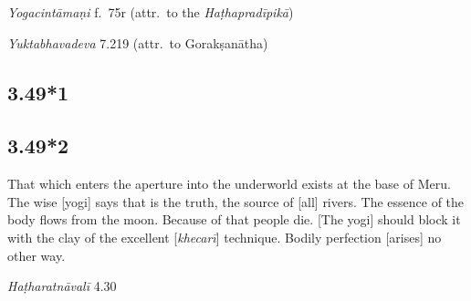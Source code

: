 \begin{ekdosis}
\begin{testimonia}[hp03_049]
\emph{Yogacintāmaṇi} f.~75r (attr.~to the \emph{Haṭhapradīpikā})
\begin{versinnote}
\end{versinnote}

\emph{Yuktabhavadeva} 7.219 (attr.~to Gorakṣanātha)
\begin{versinnote}
\end{versinnote}
\end{testimonia}


\subsection*{3.49*1}


\subsection*{3.49*2}
\begin{translation}[hp03_049_2]
That which enters the aperture into the underworld exists at the base of Meru. The wise [yogi] says that is the truth, the source of [all] rivers. The essence of the body flows from the moon. Because of that people die. [The yogi] should block it with the clay of the excellent [\emph{khecarī}] technique. Bodily perfection [arises] no other way.
\end{translation}%


\begin{testimonia}[hp03_049_2]
\emph{Haṭharatnāvalī} 4.30
\begin{versinnote}
\end{versinnote}


\end{testimonia}
\end{ekdosis}
